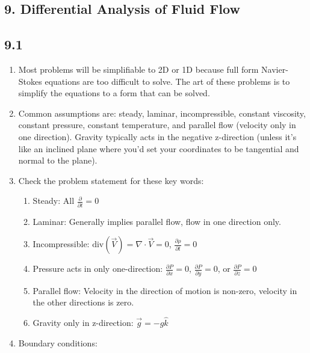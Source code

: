 \documentclass[10pt]{article}
\begin{document}
\begin{multicols*}{2}
\section*{9. Differential Analysis of Fluid Flow}
\subsection*{9.1}
\begin{enumerate}
    \item Most problems will be simplifiable to 2D or 1D because full form Navier-Stokes equations are too difficult to solve. The art of these 
    problems is to simplify the equations to a form that can be solved.
    \item Common assumptions are: steady, laminar, incompressible, constant viscosity, constant pressure, constant temperature, and
    parallel flow (velocity only in one direction). Gravity typically acts in the negative z-direction (unless it's like an inclined 
    plane where you'd set your coordinates to be tangential and normal to the plane).
    \item Check the problem statement for these key words: %
    \begin{enumerate}[label=\roman*)]
        \item Steady: All $\frac{\partial}{\partial t} = 0$
        \item Laminar: Generally implies parallel flow, flow in one direction only.
        \item Incompressible: $\text{div}(\vec{V}) = \nabla \cdot \vec{V} = 0$, $\frac{\partial \rho}{\partial t} = 0$
        \item Pressure acts in only one-direction: $\frac{\partial P}{\partial x} = 0$, $\frac{\partial P}{\partial y} = 0$, or $\frac{\partial P}{\partial z} = 0$ 
        \item Parallel flow: Velocity in the direction of motion is non-zero, velocity in the other directions is zero.
        \item Gravity only in z-direction: $\vec{g} = -g \hat{k}$
    \end{enumerate}
    \item Boundary conditions:

\end{enumerate}
\end{multicols*}
\end{document}
